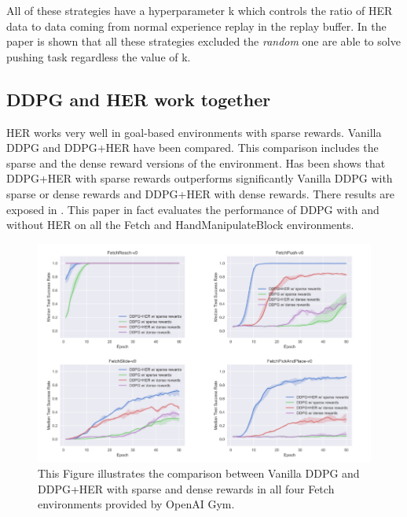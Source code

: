 \documentclass[a4paper]{report}
\begin{document}
All of these strategies have a hyperparameter k which controls the ratio of HER data to data coming from normal experience replay in the replay buffer. In the paper is shown that all these strategies excluded the \textit{random} one are able to solve pushing task regardless the value of k.

\subsection{DDPG and HER work together}
HER works very well in goal-based environments with sparse rewards. Vanilla DDPG and DDPG+HER have been compared.  This comparison includes the sparse and the dense reward versions of the environment. Has been shows that DDPG+HER with sparse rewards outperforms significantly Vanilla DDPG with sparse or dense rewards and DDPG+HER with dense rewards. There results are exposed in \cite{multigoal}. This paper in fact evaluates the performance of DDPG with and without HER on all the Fetch and HandManipulateBlock environments. 

\begin{figure}[h!]
\centering
\includegraphics[scale=0.65]{fetchcomparison.png}
\caption{\label{Fig: comparison} This Figure illustrates the comparison between Vanilla DDPG and DDPG+HER with sparse and dense rewards in all four Fetch environments provided by OpenAI Gym.}
\end{figure}
\end{document}
